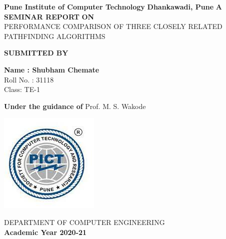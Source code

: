 \documentclass[a4paper, 12pt]{article}
\begin{document}
 
\begin{titlepage}
    \begin{center}
        \vspace*{1cm}
        
        \large
                \textbf{Pune Institute of Computer Technology}	
                \linebreak
		\textbf{Dhankawadi, Pune}
        \vspace{0.5cm}
                        \linebreak
                        \linebreak
        \textbf{A SEMINAR REPORT }
        \linebreak
        \textbf{ON }
        \linebreak
        \vspace{0.5cm}
        \large
        \\PERFORMANCE COMPARISON OF THREE CLOSELY RELATED PATHFINDING ALGORITHMS 
        \linebreak
        \linebreak
		
		\textbf{SUBMITTED BY}
		\vspace{1cm}
		
        \textbf{ Name : Shubham Chemate}
        \\ Roll No. : 31118
        \\ Class: TE-1
        \linebreak
        \linebreak
		        
        \textbf{\large{Under the guidance of}}
		\linebreak
	    Prof. M. S. Wakode
		\linebreak
        
        
        
        \vspace{0.8cm}
        

        \includegraphics[scale=0.6]{pict}   
        
        \Large
        DEPARTMENT OF COMPUTER ENGINEERING\\
		\textbf{Academic Year 2020-21}
        
    \end{center}
\end{titlepage}
\end{document}
